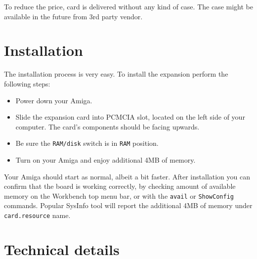 \documentclass[10pt,a5paper]{article}
\begin{document}
To reduce the price, card is delivered without any kind of case. The case might be available in the future from 3rd party vendor.

\section*{Installation}

The installation process is very easy. To install the expansion perform the following steps:

\begin{itemize}
	\item Power down your Amiga.
	\item Slide the expansion card into PCMCIA slot, located on the left side of your computer. The card's components should be facing upwards.
	\item Be sure the {\tt RAM/disk} switch is in {\tt RAM} position.
	\item Turn on your Amiga and enjoy additional 4MB of memory.
\end{itemize}

Your Amiga should start as normal, albeit a bit faster. After installation you can confirm that the board is working correctly, by checking amount of available memory on the Workbench top menu bar, or with the {\tt avail} or {\tt ShowConfig} commands. Popular SysInfo tool will report the additional 4MB of memory under {\tt card.resource} name.

\section*{Technical details}
\end{document}
